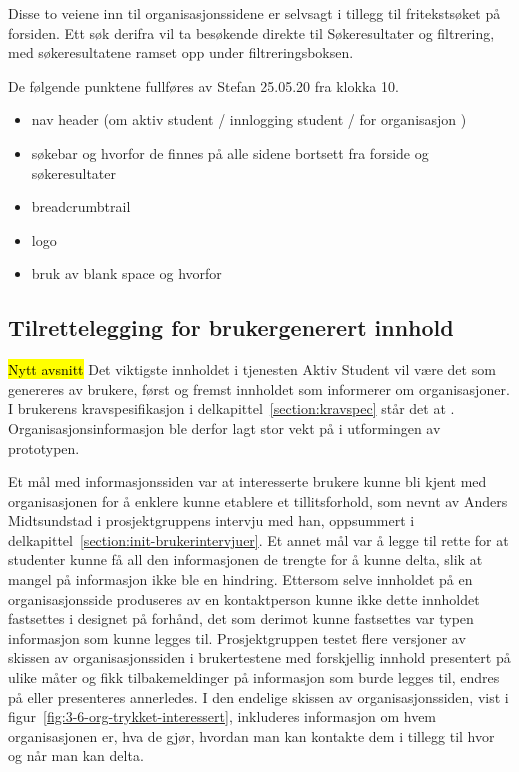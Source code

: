 Disse to veiene inn til organisasjonssidene er selvsagt i tillegg til fritekstsøket på forsiden. Ett søk derifra vil ta besøkende direkte til Søkeresultater og filtrering, med søkeresultatene ramset opp under filtreringsboksen.

De følgende punktene fullføres av Stefan 25.05.20 fra klokka 10.
\begin{itemize}
\item nav header (om aktiv student / innlogging student / for organisasjon )
\item søkebar og hvorfor de finnes på alle sidene bortsett fra forside og søkeresultater
\item breadcrumbtrail
\item logo
\item bruk av blank space og hvorfor
\end{itemize}


\subsection{Tilrettelegging for brukergenerert innhold}
\hl{Nytt avsnitt}
Det viktigste innholdet i tjenesten Aktiv Student vil være det som genereres av brukere, først og fremst innholdet som informerer om organisasjoner. I brukerens kravspesifikasjon i delkapittel~\ref{section:kravspec} står det at . Organisasjonsinformasjon ble derfor lagt stor vekt på i utformingen av prototypen.

Et mål med informasjonssiden var at interesserte brukere kunne bli kjent med organisasjonen for å enklere kunne etablere et tillitsforhold, som nevnt av Anders Midtsundstad i prosjektgruppens intervju med han, oppsummert i delkapittel~\ref{section:init-brukerintervjuer}. Et annet mål var å legge til rette for at studenter kunne få all den informasjonen de trengte for å kunne delta, slik at mangel på informasjon ikke ble en hindring. Ettersom selve innholdet på en organisasjonsside produseres av en kontaktperson kunne ikke dette innholdet fastsettes i designet på forhånd, det som derimot kunne fastsettes var typen informasjon som kunne legges til. Prosjektgruppen testet flere versjoner av skissen av organisasjonssiden i brukertestene med forskjellig innhold presentert på ulike måter og fikk tilbakemeldinger på informasjon som burde legges til, endres på eller presenteres annerledes. I den endelige skissen av organisasjonssiden, vist i figur~\ref{fig:3-6-org-trykket-interessert}, inkluderes informasjon om hvem organisasjonen er, hva de gjør, hvordan man kan kontakte dem i tillegg til hvor og når man kan delta.

